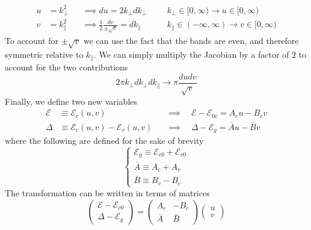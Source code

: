 \begin{align}
 u &= k_{\perp}^{2} &&\implies du = 2k_{\perp}dk_{\perp} &&& k_{\perp}\in[0,\infty)\to u\in[0,\infty)\\
 v &= k_{\parallel}^{2} &&\implies \frac{1}{2}\frac{dv}{\pm\sqrt{ v }} = dk_{\parallel} &&& k_{\parallel}\in(-\infty,\infty)\to v\in[0,\infty)
\label{eq:quadratic_interband_cov2}
\end{align}
To account for $\pm\sqrt{ v }$ we can use the fact that the bands are even, and therefore symmetric relative to $k_{\parallel}$. We can simply multiply the Jacobian by a factor of $2$ to account for the two contributions
\begin{equation}
2\pi k_{\perp} dk_{\perp} dk_{\parallel} \to \pi \frac{dudv}{\sqrt{ v }}
\label{eq:quadratic_interband_jacobian}
\end{equation}
Finally, we define two new variables
\begin{align}
\mathcal{E} &\equiv \mathcal{E}_{c}(u,v)  &&\implies\quad \mathcal{E}-\mathcal{E}_{0c} = A_{c}u - B_{c}v\\
\Delta &\equiv \mathcal{E}_{c}(u,v) - \mathcal{E}_{v}(u,v) &&\implies\quad\Delta - \mathcal{E}_{g} = \overline{A}u - \overline{B}v
\label{eq:quadratic_interband_new_variables}
\end{align}
where the following are defined for the sake of brevity
\begin{equation}
\begin{cases}
\mathcal{E}_{g} \equiv \mathcal{E}_{c0}+\mathcal{E}_{v 0} \\
\overline{A}  \equiv A_{c}+A_{v} \\
\overline{B}  \equiv B_{v}-B_{c}
\end{cases}
\label{eq:quadratic_interband_definitions}
\end{equation}
The transformation can be written in terms of matrices
\begin{equation}
\begin{pmatrix} \mathcal{E} - \mathcal{E}_{c0} \\ \Delta - \mathcal{E}_g \end{pmatrix} = \begin{pmatrix} A_c & -B_c \\ \bar{A} & \bar{B} \end{pmatrix} \begin{pmatrix} u \\ v \end{pmatrix}
\label{eq:quadratic_interband_matrix_transform}
\end{equation}
